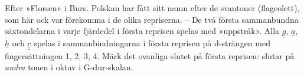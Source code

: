 Efter »Florsen» i Burs. Polskan har fått sitt namn efter de svantoner (flageolett),
som här ock var förekomma i de olika repriserna. -- De två första
sammanbundna säxtondelarna i varje fjärdedel i första reprisen
spelas med »uppstråk». Alla $\underline{g}$, $\underline{a}$, $\underline{h}$ och $\underline{\underline{c}}$ spelas i sammanbindningarna
i första reprisen på d-strängen med fingersättningen 1, 2, 3, 4.
Märk det ovanliga slutet på första reprisen: slutar på \textit{andra}
tonen i oktav i G-dur-skalan.
\medskip